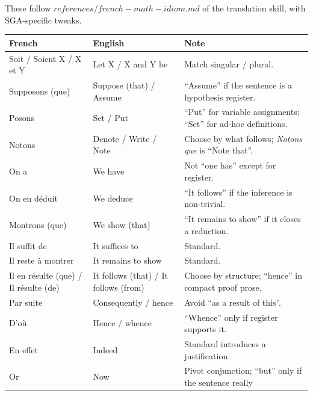 \documentclass[
  11pt,
  a4paper,
]{book}
\newcounter{none} %
\begin{document}
These follow \(references/french-math-idiom.md\) of the translation
skill, with SGA-specific tweaks.

{\def\LTcaptype{none} %
\begin{longtable}[]{@{}
  >{\raggedright\arraybackslash}p{}
  >{\raggedright\arraybackslash}p{}
  >{\raggedright\arraybackslash}p{}@{}}
\toprule\noalign{}
\begin{minipage}[b]{\linewidth}\raggedright
French
\end{minipage} & \begin{minipage}[b]{\linewidth}\raggedright
English
\end{minipage} & \begin{minipage}[b]{\linewidth}\raggedright
Note
\end{minipage} \\
\midrule\noalign{}
\endhead
\bottomrule\noalign{}
\endlastfoot
Soit / Soient X / X et Y & Let X / X and Y be & Match singular /
plural. \\
Supposons (que) & Suppose (that) / Assume & ``Assume'' if the sentence
is a hypothesis register. \\
Posons & Set / Put & ``Put'' for variable assignments; ``Set'' for
ad-hoc definitions. \\
Notons & Denote / Write / Note & Choose by what follows; \emph{Notons
que} is ``Note that''. \\
On a & We have & Not ``one has'' except for register. \\
On en déduit & We deduce & ``It follows'' if the inference is
non-trivial. \\
Montrons (que) & We show (that) & ``It remains to show'' if it closes a
reduction. \\
Il suffit de & It suffices to & Standard. \\
Il reste à montrer & It remains to show & Standard. \\
Il en résulte (que) / Il résulte (de) & It follows (that) / It follows
(from) & Choose by structure; ``hence'' in compact proof prose. \\
Par suite & Consequently / hence & Avoid ``as a result of this''. \\
D'où & Hence / whence & ``Whence'' only if register supports it. \\
En effet & Indeed & Standard introduces a justification. \\
Or & Now & Pivot conjunction; ``but'' only if the sentence really

\end{longtable}}
\end{document}
